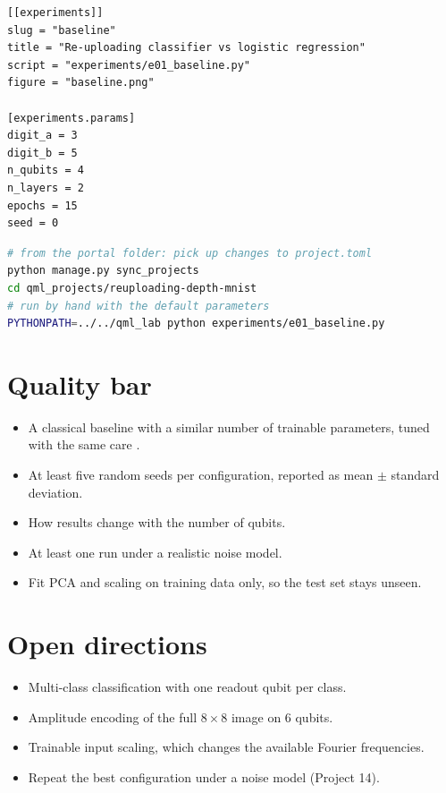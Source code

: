 \documentclass[11pt,a4paper]{article}
\begin{document}
\begin{lstlisting}[language={}]
[[experiments]]
slug = "baseline"
title = "Re-uploading classifier vs logistic regression"
script = "experiments/e01_baseline.py"
figure = "baseline.png"

[experiments.params]
digit_a = 3
digit_b = 5
n_qubits = 4
n_layers = 2
epochs = 15
seed = 0
\end{lstlisting}

\begin{lstlisting}[language=bash]
# from the portal folder: pick up changes to project.toml
python manage.py sync_projects
cd qml_projects/reuploading-depth-mnist
# run by hand with the default parameters
PYTHONPATH=../../qml_lab python experiments/e01_baseline.py
\end{lstlisting}

\section{Quality bar}
\begin{itemize}
  \item A classical baseline with a similar number of trainable parameters, tuned with the same care \citep{bowles2024}.
  \item At least five random seeds per configuration, reported as mean $\pm$ standard deviation.
  \item How results change with the number of qubits.
  \item At least one run under a realistic noise model.
  \item Fit PCA and scaling on training data only, so the test set stays unseen.
\end{itemize}

\section{Open directions}
\begin{itemize}
  \item Multi-class classification with one readout qubit per class.
  \item Amplitude encoding of the full $8\times8$ image on 6 qubits.
  \item Trainable input scaling, which changes the available Fourier frequencies.
  \item Repeat the best configuration under a noise model (Project 14).
\end{itemize}
\end{document}
